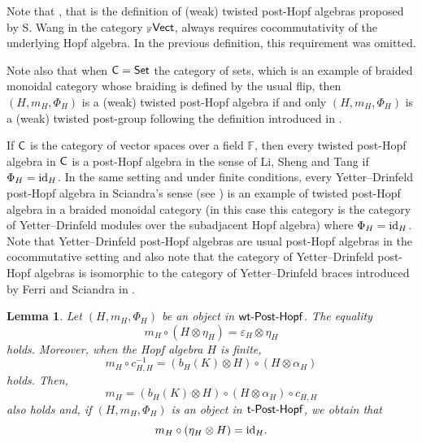 \documentclass[10pt,a4paper]{amsart}
\numberwithin{equation}{section}
\newtheorem{Lemma}[Theorem]{Lemma}
 { \theoremstyle{definition}
\newtheorem{Definition}[Theorem]{Definition}
\newtheorem{Example}[Theorem]{Example}
\newtheorem{Remark}[Theorem]{Remark} }
\begin{document}
\begin{Remark}
Note that \cite[Definition 6.3]{Wang}, that is the definition of (weak) twisted post-Hopf algebras proposed by S. Wang in the category ${}_{\mathbb{F}}\sf{Vect}$, always requires cocommutativity of the underlying Hopf algebra. In the previous definition, this requirement was omitted.

Note also that when ${\sf C}={\sf Set}$ the category of sets, which is an example of braided monoidal category whose braiding is defined by the usual flip, then $(H,m_{H},\Phi_{H})$ is a (weak) twisted post-Hopf algebra if and only $(H,m_{H},\Phi_{H})$ is a (weak) twisted post-group following the definition introduced in \cite[Definition 2.1]{Wang}.
\end{Remark}
\begin{Example}\label{ExampleTwPHA}
If ${\sf C}$ is the category of vector spaces over a field ${\mathbb F}$, then every twisted post-Hopf algebra in ${\sf C}$ is a post-Hopf algebra in the sense of Li, Sheng and Tang if $\Phi_{H}={\rm id}_{H}$. In the same setting and under finite conditions, every Yetter--Drinfeld post-Hopf algebra in Sciandra's sense (see \cite{SCI}) is an example of twisted post-Hopf algebra in a braided monoidal category (in this case this category is the category of Yetter--Drinfeld modules over the subadjacent Hopf algebra) where $\Phi_{H}={\rm id}_{H}$. Note that Yetter--Drinfeld post-Hopf algebras are usual post-Hopf algebras in the cocommutative setting and also note that the category of Yetter--Drinfeld post-Hopf algebras is isomorphic to the category of Yetter--Drinfeld braces introduced by Ferri and Sciandra in \cite{FSCI}.
\end{Example}
\begin{Lemma}
Let $(H,m_{H},\Phi_{H})$ be an object in ${\sf wt}\textnormal{-}\sf{Post}\textnormal{-}\sf{Hopf}$. The equality
\begin{equation}\label{mHprop1}
m_{H}\circ(H\otimes\eta_{H})=\varepsilon_{H}\otimes\eta_{H}
\end{equation}
holds. Moreover, when the Hopf algebra $H$ is finite,
\begin{equation}\label{lem1prop1}
m_{H}\circ c_{H,H}^{-1}=( b_{H}(K)\otimes H)\circ(H\otimes\alpha_{H})
\end{equation}
holds. Then,
\begin{equation}\label{lem1prop2}
m_{H}=( b_{H}(K)\otimes H)\circ(H\otimes\alpha_{H})\circ c_{H,H}
\end{equation}
also holds and, if $(H,m_{H},\Phi_{H})$ is an object in ${\sf t}\textnormal{-}\sf{Post}\textnormal{-}\sf{Hopf}$, we obtain that
\begin{equation}\label{mHprop2}
m_{H}\circ(\eta_{H}\otimes H)={\rm id}_{H}.
\end{equation}
\end{Lemma}
\end{document}
